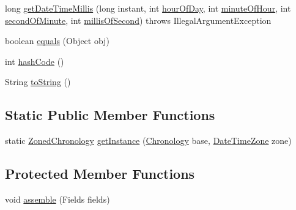 \begin{DoxyCompactItemize}
\item 
long \hyperlink{classorg_1_1joda_1_1time_1_1chrono_1_1_zoned_chronology_a181bb219ab043b0ca7069eb778ab2111}{get\-Date\-Time\-Millis} (long instant, int \hyperlink{classorg_1_1joda_1_1time_1_1chrono_1_1_assembled_chronology_a7bb60a080dea96b8103a530f88a4fb54}{hour\-Of\-Day}, int \hyperlink{classorg_1_1joda_1_1time_1_1chrono_1_1_assembled_chronology_afae2a5fd2073af85a1d2008d98313da7}{minute\-Of\-Hour}, int \hyperlink{classorg_1_1joda_1_1time_1_1chrono_1_1_assembled_chronology_adc867c7197cd2ae0d480003d22d9fdb7}{second\-Of\-Minute}, int \hyperlink{classorg_1_1joda_1_1time_1_1chrono_1_1_assembled_chronology_a16f1e731a421127a787ac71ffded4387}{millis\-Of\-Second})  throws Illegal\-Argument\-Exception     
\item 
boolean \hyperlink{classorg_1_1joda_1_1time_1_1chrono_1_1_zoned_chronology_ae12dfc97bc722fa2cf013e36c683bd20}{equals} (Object obj)
\item 
int \hyperlink{classorg_1_1joda_1_1time_1_1chrono_1_1_zoned_chronology_a4d2d148a68fbec347b879c7e42dea3a5}{hash\-Code} ()
\item 
String \hyperlink{classorg_1_1joda_1_1time_1_1chrono_1_1_zoned_chronology_a291997eb31abb67eda89ea48139b1cae}{to\-String} ()
\end{DoxyCompactItemize}
\subsection*{Static Public Member Functions}
\begin{DoxyCompactItemize}
\item 
static \hyperlink{classorg_1_1joda_1_1time_1_1chrono_1_1_zoned_chronology}{Zoned\-Chronology} \hyperlink{classorg_1_1joda_1_1time_1_1chrono_1_1_zoned_chronology_a79ca70c02cfd57f5352eb0d06bf12900}{get\-Instance} (\hyperlink{classorg_1_1joda_1_1time_1_1_chronology}{Chronology} base, \hyperlink{classorg_1_1joda_1_1time_1_1_date_time_zone}{Date\-Time\-Zone} zone)
\end{DoxyCompactItemize}
\subsection*{Protected Member Functions}
\begin{DoxyCompactItemize}
\item 
void \hyperlink{classorg_1_1joda_1_1time_1_1chrono_1_1_zoned_chronology_a0259d0ca72cba32c10888771ebca976d}{assemble} (Fields fields)
\end{DoxyCompactItemize}


